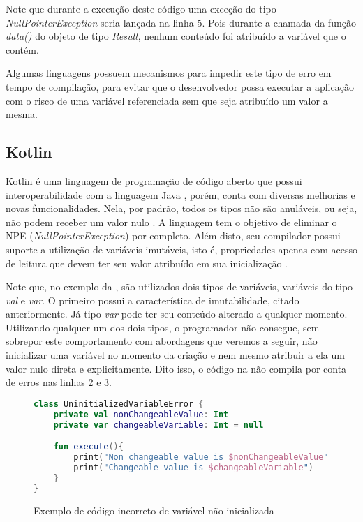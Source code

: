 Note que durante a execução deste código uma exceção do tipo \textit{NullPointerException} seria lançada na linha 5. Pois durante a chamada da função \textit{data()} do objeto de tipo \textit{Result}, nenhum conteúdo foi atribuído a variável que o contém.

Algumas linguagens possuem mecanismos para impedir este tipo de erro em tempo de compilação, para evitar que o desenvolvedor possa executar a aplicação com o risco de uma variável referenciada sem que seja atribuído um valor a mesma.

\subsection{Kotlin}\label{subsec:most_common_error_uninit_variable_kotlin}

Kotlin é uma linguagem de programação de código aberto \cite{kotlin_source} que possui interoperabilidade com a linguagem Java \cite{kotlin_get_started}, porém, conta com diversas melhorias e novas funcionalidades. Nela, por padrão, todos os tipos não são anuláveis, ou seja, não podem receber um valor nulo \cite{kotlin_nullable_types}. A linguagem tem o objetivo de eliminar o NPE (\textit{NullPointerException}) \cite{kotlin_null_safety} por completo. Além disto, seu compilador possui suporte a utilização de variáveis imutáveis, isto é, propriedades apenas com acesso de leitura que devem ter seu valor atribuído em sua inicialização \cite{kotlin_variables}.

Note que, no exemplo da , são utilizados dois tipos de variáveis, variáveis do tipo \textit{val} e \textit{var}. O primeiro possui a característica de imutabilidade, citado anteriormente. Já tipo \textit{var} pode ter seu conteúdo alterado a qualquer momento. Utilizando qualquer um dos dois tipos, o programador não consegue, sem sobrepor este comportamento com abordagens que veremos a seguir, não inicializar uma variável no momento da criação e nem mesmo atribuir a ela um valor nulo direta e explicitamente. Dito isso, o código na  não compila por conta de erros nas linhas 2 e 3.

\begin{figure}[H]
    \centering
    \begin{lstlisting}[language=kotlin]
class UninitializedVariableError {
    private val nonChangeableValue: Int
    private var changeableVariable: Int = null

    fun execute(){
        print("Non changeable value is $nonChangeableValue")
        print("Changeable value is $changeableVariable")
    }
}
    \end{lstlisting}
    \caption{Exemplo de código incorreto de variável não inicializada}
    \label{fig:kotlin_not_init_variable}
\end{figure}

